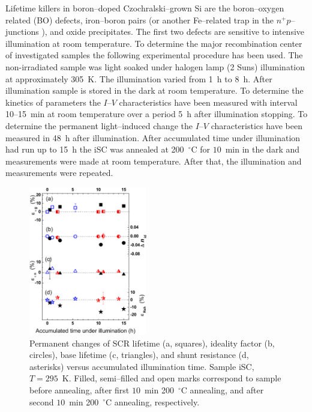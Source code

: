 \documentclass[aip,jap, amsmath,amssymb,reprint]{revtex4-1}
\begin{document}
Lifetime killers  in boron--doped Czochralski--grown Si are the  boron--oxygen related (BO) defects,\cite{LIDRev,LIDRev2}
iron--boron pairs \cite{MurphyJAP2011,FeB:Vahanissi,FeB:Schmidt} (or another Fe--related trap in the $n^+p$--junctions \cite{TeimurazPSS,TeimurazJAP}),
and oxide precipitates.\cite{MurphySC2014,Oxide_Schon,MurphyJAP2011,MurphyJAP2012,Oxide:Chen,Oxide:Porrini}
The first two defects are sensitive to intensive illumination at room temperature.
To determine the major recombination center of investigated samples the following experimental procedure has been used.
The non-irradiated sample was light soaked under halogen lamp (2 Suns) illumination at approximately 305~K.
The illumination varied from 1~h to 8~h.
After illumination sample is stored in the dark at room temperature.
To determine the kinetics of parameters the $I$--$V$ characteristics have been measured with interval 10--15~min at room temperature over a period 5~h after illumination stopping.
To determine the permanent light--induced change the $I$--$V$ characteristics have been measured in 48~h after illumination.
After accumulated time under illumination had run up to 15~h the iSC was annealed at 200~$^\circ$C for $10$~min in the dark and measurements were made at room temperature.
After that, the illumination and measurements were repeated.


\begin{figure}
\includegraphics[width=0.46\textwidth]{fig_10}%
\caption{\label{fig_Illum}
Permanent changes of SCR lifetime (a, squares), ideality factor (b, circles), base lifetime (c, triangles), and shunt resistance (d, asterisks) versus accumulated illumination time.
Sample iSC, $T=295$~K.
Filled, semi--filled and open marks correspond to sample before annealing, after first $10$~min 200~$^\circ$C annealing, and after second $10$~min 200~$^\circ$C annealing, respectively.
}%
\end{figure}
\end{document}

